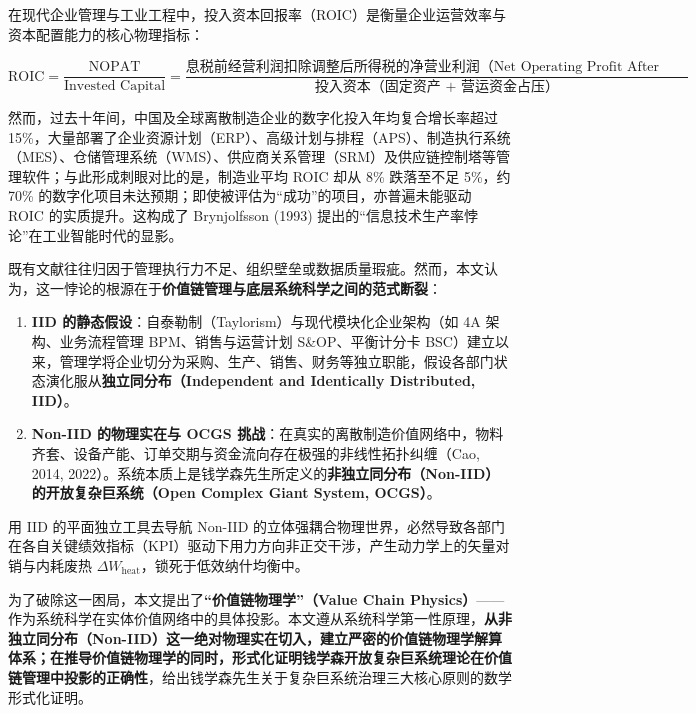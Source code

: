 \documentclass[
]{article}
\providecommand{\tightlist}{%
  \setlength{\itemsep}{0pt}\setlength{\parskip}{0pt}}
\begin{document}
在现代企业管理与工业工程中，投入资本回报率（ROIC）是衡量企业运营效率与资本配置能力的核心物理指标：

\[\text{ROIC} = \frac{\text{NOPAT}}{\text{Invested Capital}} = \frac{\text{息税前经营利润扣除调整后所得税的净营业利润（Net Operating Profit After Tax, NOPAT）}}{\text{投入资本（固定资产 + 营运资金占压）}}\]

然而，过去十年间，中国及全球离散制造企业的数字化投入年均复合增长率超过
15\%，大量部署了企业资源计划（ERP）、高级计划与排程（APS）、制造执行系统（MES）、仓储管理系统（WMS）、供应商关系管理（SRM）及供应链控制塔等管理软件；与此形成刺眼对比的是，制造业平均
ROIC 却从 8\% 跌落至不足 5\%，约 70\%
的数字化项目未达预期；即使被评估为``成功''的项目，亦普遍未能驱动 ROIC
的实质提升。这构成了 Brynjolfsson (1993)
提出的``信息技术生产率悖论''在工业智能时代的显影。

既有文献往往归因于管理执行力不足、组织壁垒或数据质量瑕疵。然而，本文认为，这一悖论的根源在于\textbf{价值链管理与底层系统科学之间的范式断裂}：

\begin{enumerate}
\def\labelenumi{\arabic{enumi}.}
\tightlist
\item
  \textbf{IID 的静态假设}：自泰勒制（Taylorism）与现代模块化企业架构（如
  4A 架构、业务流程管理 BPM、销售与运营计划 S\&OP、平衡计分卡
  BSC）建立以来，管理学将企业切分为采购、生产、销售、财务等独立职能，假设各部门状态演化服从\textbf{独立同分布（Independent
  and Identically Distributed, IID）}。
\item
  \textbf{Non-IID 的物理实在与 OCGS
  挑战}：在真实的离散制造价值网络中，物料齐套、设备产能、订单交期与资金流向存在极强的非线性拓扑纠缠（Cao,
  2014,
  2022）。系统本质上是钱学森先生所定义的\textbf{非独立同分布（Non-IID）的开放复杂巨系统（Open
  Complex Giant System, OCGS）}。
\end{enumerate}

用 IID 的平面独立工具去导航 Non-IID
的立体强耦合物理世界，必然导致各部门在各自关键绩效指标（KPI）驱动下用力方向非正交干涉，产生动力学上的矢量对销与内耗废热
\(\Delta W_{\text{heat}}\)，锁死于低效纳什均衡中。

为了破除这一困局，本文提出了\textbf{``价值链物理学''（Value Chain
Physics）}------作为系统科学在实体价值网络中的具体投影。本文遵从系统科学第一性原理，\textbf{从非独立同分布（Non-IID）这一绝对物理实在切入，建立严密的价值链物理学解算体系；在推导价值链物理学的同时，形式化证明钱学森开放复杂巨系统理论在价值链管理中投影的正确性}，给出钱学森先生关于复杂巨系统治理三大核心原则的数学形式化证明。
\end{document}
